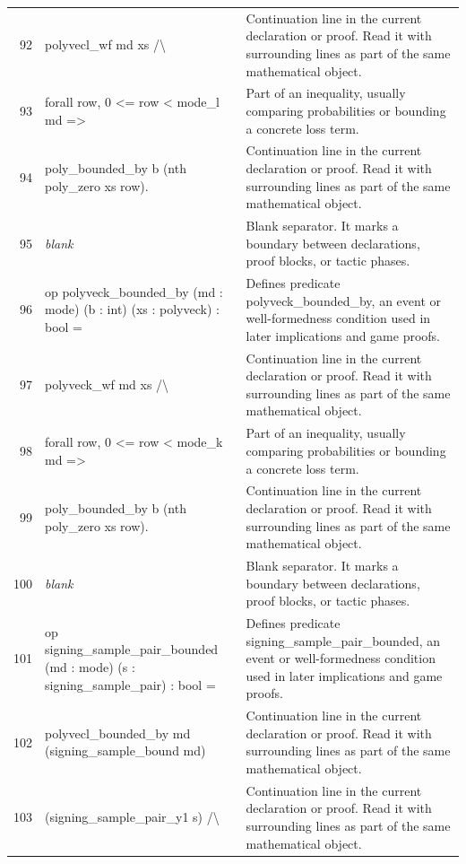 \documentclass[10pt]{article}
\begin{document}
\begin{longtable}{r L{0.53\textwidth} L{0.37\textwidth}}
92 & {\ttfamily\scriptsize   polyvecl\_wf md xs /\textbackslash{}} & Continuation line in the current declaration or proof.  Read it with surrounding lines as part of the same mathematical object. \\
93 & {\ttfamily\scriptsize   forall row, 0 <= row < mode\_l md =>} & Part of an inequality, usually comparing probabilities or bounding a concrete loss term. \\
94 & {\ttfamily\scriptsize     poly\_bounded\_by b (nth poly\_zero xs row).} & Continuation line in the current declaration or proof.  Read it with surrounding lines as part of the same mathematical object. \\
95 & {\ttfamily\scriptsize \emph{blank}} & Blank separator.  It marks a boundary between declarations, proof blocks, or tactic phases. \\
96 & {\ttfamily\scriptsize op polyveck\_bounded\_by (md : mode) (b : int) (xs : polyveck) : bool =} & Defines predicate polyveck\_bounded\_by, an event or well-formedness condition used in later implications and game proofs. \\
97 & {\ttfamily\scriptsize   polyveck\_wf md xs /\textbackslash{}} & Continuation line in the current declaration or proof.  Read it with surrounding lines as part of the same mathematical object. \\
98 & {\ttfamily\scriptsize   forall row, 0 <= row < mode\_k md =>} & Part of an inequality, usually comparing probabilities or bounding a concrete loss term. \\
99 & {\ttfamily\scriptsize     poly\_bounded\_by b (nth poly\_zero xs row).} & Continuation line in the current declaration or proof.  Read it with surrounding lines as part of the same mathematical object. \\
100 & {\ttfamily\scriptsize \emph{blank}} & Blank separator.  It marks a boundary between declarations, proof blocks, or tactic phases. \\
101 & {\ttfamily\scriptsize op signing\_sample\_pair\_bounded (md : mode) (s : signing\_sample\_pair) : bool =} & Defines predicate signing\_sample\_pair\_bounded, an event or well-formedness condition used in later implications and game proofs. \\
102 & {\ttfamily\scriptsize   polyvecl\_bounded\_by md (signing\_sample\_bound md)} & Continuation line in the current declaration or proof.  Read it with surrounding lines as part of the same mathematical object. \\
103 & {\ttfamily\scriptsize     (signing\_sample\_pair\_y1 s) /\textbackslash{}} & Continuation line in the current declaration or proof.  Read it with surrounding lines as part of the same mathematical object. \\

\end{longtable}
\end{document}
